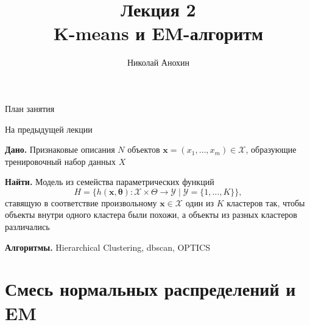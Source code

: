 \documentclass[aspectratio=169]{beamer}
\author{Николай Анохин}
\title{\newline \newline \newline Лекция 2 \\ K-means и EM-алгоритм}
\let\otp\titlepage
\renewcommand{\titlepage}{\otp\addtocounter{framenumber}{-1}}
\begin{document}

\begin{frame}[plain]
\titlepage
\end{frame}

\begin{frame}{План занятия}
\tableofcontents
\end{frame}

\begin{frame}{На предыдущей лекции}

\vspace{1em}
{\bf Дано.} Признаковые описания $N$ объектов $\mathbf{x} = (x_1, \ldots, x_m) \in \mathcal{X}$, образующие тренировочный набор данных $X$

\vspace{1em}
{\bf Найти.} Модель из семейства параметрических функций 
\[
H = \{h(\mathbf{x, \mathbf{\theta}}): \mathcal{X} \times \Theta \rightarrow \mathcal{Y} \mid \mathcal{Y} = \{1, \ldots, K\}\},
\]
ставящую в соответствие произвольному $\mathbf{x} \in \mathcal{X}$ один из $K$ кластеров так, чтобы объекты внутри одного кластера были похожи, а объекты из разных кластеров различались

\vspace{1em}
{\bf Алгоритмы.} Hierarchical Clustering, dbscan, OPTICS

\end{frame}

\section{Смесь нормальных распределений и EM}
\end{document}
